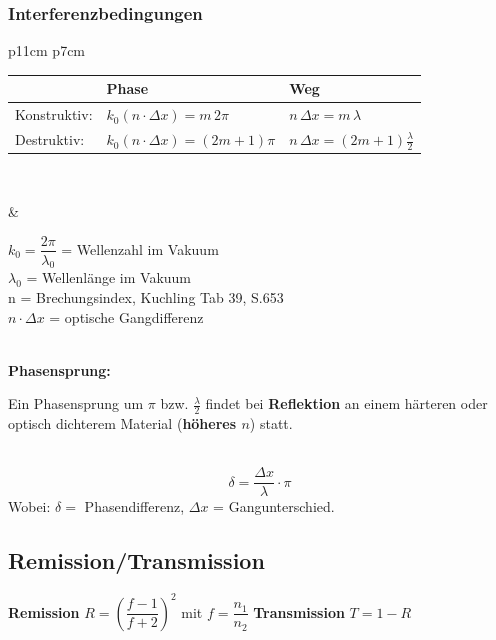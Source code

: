\subsubsection{Interferenzbedingungen}
\begin{tabular}{p{11cm} p{7cm}}
\begin{minipage}[]{11cm}
	\begin{tabular}{|l|l|l|}
	\hline
	& \textbf{Phase} & \textbf{Weg} \\
	\hline
	Konstruktiv: 
		& $k_0(n\cdot \Delta x)=m \, 2\pi$
		& $n \, \Delta x = m \, \lambda$ \\
	Destruktiv: 
	 	& $k_0(n\cdot \Delta x)=(2m+1)\pi$
	 	& $n \, \Delta x = (2m+1) \frac{\lambda}{2}$ \\
	\hline
	\end{tabular}\\
	\end{minipage}
	& \parbox{8cm}{$k_0 = \dfrac{2\pi}{\lambda_0}$ = Wellenzahl im Vakuum\\
	$ \lambda_0$ = Wellenlänge im Vakuum\\
	n = Brechungsindex, Kuchling Tab 39, S.653\\
	$n\cdot \Delta x$ = optische Gangdifferenz}
\end{tabular}\\
\textbf{Phasensprung:}
		\parbox{16cm}{Ein Phasensprung um $\pi$ bzw. $\frac{\lambda}{2}$ findet bei
		\textbf{Reflektion} an einem härteren oder optisch dichterem Material
		(\textbf{höheres $n$}) statt.}\\
		
\[
	\delta = \frac{\Delta x}{\lambda}\cdot \pi
\]
	Wobei: $\delta = $ Phasendifferenz, $\Delta x $ = Gangunterschied. 	
\subsection{Remission/Transmission}
\textbf{Remission} $R= \left(\dfrac{f-1}{f+2}\right)^2$ mit $ f = \dfrac{n_1}{n_2}$\hspace{2cm} \textbf{Transmission} $T = 1-R$  





